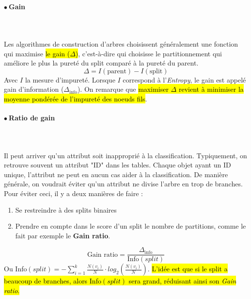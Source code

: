 \documentclass[letterpaper, 12pt]{article}
\newcommand{\alinea}{
\hspace*{0.5cm}}
\newcommand{\point}{$\bullet\ $}
\begin{document}
			\paragraph{\point Gain}~\\~\\
			\alinea Les algorithmes de construction d'arbres choisissent 
				généralement une fonction qui maximise \hl{le gain ($\Delta$)}, 
				c'est-à-dire qui choisisse le partitionnement qui
				améliore le plus la pureté du split comparé à la pureté
				du parent.
				$$ \Delta = I(\text{parent}) - I(\text{split}) $$
			Avec $I$ la mesure d'impureté. Lorsque $I$ 
			correspond à l'\textit{Entropy}, le gain est appelé gain 
			d'information ($\Delta_{\text{info}}$). On remarque que
			\hl{maximiser $\Delta$ revient à minimiser la moyenne pondérée de 
			l'impureté des noeuds fils}.
			\newpage
			\paragraph{\point Ratio de gain}~\\~\\
			\alinea Il peut arriver qu'un attribut soit inapproprié à
				la classification. Typiquement, on retrouve souvent un 
				attribut "ID" dans les tables. Chaque objet ayant un
				ID unique, l'attribut ne peut en aucun cas aider à la
				classification. De manière générale, on voudrait éviter
				qu'un attribut ne divise l'arbre en trop de branches.\\
			\alinea Pour éviter ceci, il y a deux manières de faire :
			\begin{enumerate}
				\item Se restreindre à des splits binaires
				\item Prendre en compte dans le score d'un split le nombre 
					de partitions, comme le fait par exemple le 
					\textbf{Gain ratio}.
			\end{enumerate}
			$$ \text{Gain ratio} = \frac{\Delta_{\text{info}}}%
				{\text{Info}(split)}$$
			Ou Info$(split) = -\sum_{i=1}^{k} \frac{N(v_i)}{N} \cdot log_2
				(\frac{N(v_i)}{N})$. \hl{L'idée est que si le split a 
				beaucoup de branches, alors Info$(split)$ sera grand,
				réduisant ainsi son \textit{Gain ratio}.}
\end{document}
